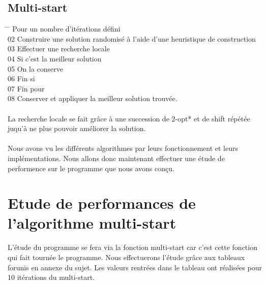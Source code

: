 \documentclass[12pt]{article}
\begin{document}
\subsection{Multi-start}

\begin{tabbing}
\hspace{1cm} \= \hspace{1cm} \=   Pour un nombre d'itérations défini\\
02  \> Construire une solution randomisé à l'aide d'une heuristique de construction\\
03  \> Effectuer une recherche locale \\
04  \> Si c'est la meilleur solution \\
05  \> \> On la conserve\\
06  \> Fin si\\
07  Fin pour\\
08  Conserver et appliquer la meilleur solution trouvée.\\
\end{tabbing}

\paragraph{}
La recherche locale se fait grâce à une succession de 2-opt* et de shift répétée juqu'à ne plus pouvoir améliorer la solution.


\paragraph{}
Nous avons vu les différents algorithmes par leurs fonctionnement et leurs implémentations. Nous allons donc maintenant effectuer une étude de performence sur 
le programme que nous avons conçu.

\clearpage
\section{Etude de performances de l'algorithme multi-start}
L'étude du programme se fera via la fonction multi-start car c'est cette fonction qui fait tournée le programme. Nous effectuerons l'étude grâce aux tableaux 
forunis en annexe du sujet. Les valeurs rentrées dans le tableau ont réalisées pour 10 itérations du multi-start.\\\
\end{document}
